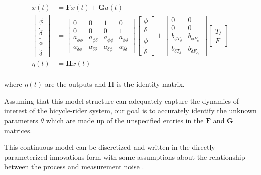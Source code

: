 \documentclass[a4paper]{article}
\begin{document}
\begin{align}
  \dot{x}(t) & =
  \mathbf{F}x(t) + \mathbf{G}u(t)\\
  \begin{bmatrix}
    \dot{\phi} \\
    \dot{\delta} \\
    \ddot{\phi} \\
    \ddot{\delta}
  \end{bmatrix}
  & =
  \begin{bmatrix}
    0 & 0 & 1 & 0\\
    0 & 0 & 0 & 1\\
    a_{\ddot{\phi}\phi} & a_{\ddot{\phi}\delta} &
    a_{\ddot{\phi}\dot{\phi}} & a_{\ddot{\phi}\dot{\delta}}\\
    a_{\ddot{\delta}\phi} & a_{\ddot{\delta}\delta} &
    a_{\ddot{\delta}\dot{\phi}} & a_{\ddot{\delta}\dot{\delta}}
  \end{bmatrix}
  \begin{bmatrix}
    \phi \\
    \delta \\
    \dot{\phi} \\
    \dot{\delta}
  \end{bmatrix}
  +
  \begin{bmatrix}
    0 & 0 \\
    0 & 0\\
    b_{\ddot{\phi}T_\delta} & b_{\ddot{\phi}F_{c_l}}\\
    b_{\ddot{\delta}T_\delta} & b_{\ddot{\delta}F_{c_l}}
  \end{bmatrix}
  \begin{bmatrix}
    T_\delta\\
    F
  \end{bmatrix}\\
  \eta(t) & = \mathbf{H}x(t)\\
\end{align}

where $\eta(t)$ are the outputs and $\mathbf{H}$ is the identity matrix.

Assuming that this model structure can adequately capture the dynamics
of interest of the bicycle-rider system, our goal is to accurately
identify the unknown parameters $\theta$ which are made up of the
unspecified entries in the $\mathbf{F}$ and $\mathbf{G}$ matrices.

This continuous model can be discretized and written in the directly
parameterized innovations form with some assumptions about the relationship
between the process and measurement noise \cite{Ljung1999}.
\end{document}
